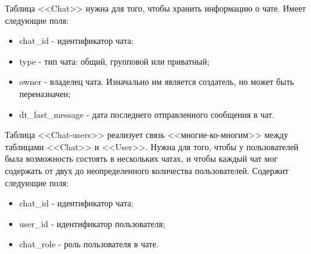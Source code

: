 \vspace{1em}

Таблица <<Chat>> нужна для того, чтобы хранить информацию о чате. Имеет следующие поля:

\begin{itemize}
    \item chat\_id - идентификатор чата;
    \item type - тип чата: общий, групповой или приватный;
    \item owner - владелец чата. Изначально им является создатель, но может быть переназначен;
    \item dt\_last\_message - дата последнего отправленного сообщения в чат.
\end{itemize}

\vspace{1em}

Таблица <<Chat-users>> реализует связь <<многие-ко-многим>> между таблицами <<Chat>> и <<User>>. Нужна для того, чтобы
у пользователей была возможность состоять в нескольких чатах, и чтобы каждый чат мог содержать от двух до неопределенного количества
пользователей. Содержит следующие поля:
\begin{itemize}
    \item chat\_id - идентификатор чата;
    \item user\_id - идентификатор пользователя;
    \item chat\_role - роль пользователя в чате.
\end{itemize}

\vspace{1em}

